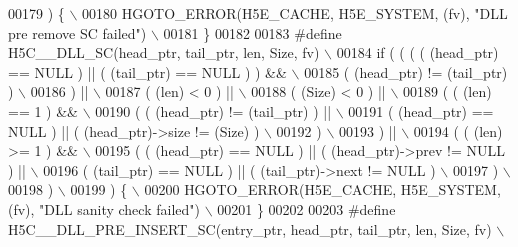 \begin{DoxyCode}
00179 \textcolor{preprocessor}{   ) \{                                                                       \(\backslash\)}
00180 \textcolor{preprocessor}{    HGOTO\_ERROR(H5E\_CACHE, H5E\_SYSTEM, (fv), "DLL pre remove SC failed")     \(\backslash\)}
00181 \textcolor{preprocessor}{\}}
00182 
00183 \textcolor{preprocessor}{#define H5C\_\_DLL\_SC(head\_ptr, tail\_ptr, len, Size, fv)                   \(\backslash\)}
00184 \textcolor{preprocessor}{if ( ( ( ( (head\_ptr) == NULL ) || ( (tail\_ptr) == NULL ) ) &&           \(\backslash\)}
00185 \textcolor{preprocessor}{       ( (head\_ptr) != (tail\_ptr) )                                      \(\backslash\)}
00186 \textcolor{preprocessor}{     ) ||                                                                \(\backslash\)}
00187 \textcolor{preprocessor}{     ( (len) < 0 ) ||                                                    \(\backslash\)}
00188 \textcolor{preprocessor}{     ( (Size) < 0 ) ||                                                   \(\backslash\)}
00189 \textcolor{preprocessor}{     ( ( (len) == 1 ) &&                                                 \(\backslash\)}
00190 \textcolor{preprocessor}{       ( ( (head\_ptr) != (tail\_ptr) ) ||                                 \(\backslash\)}
00191 \textcolor{preprocessor}{         ( (head\_ptr) == NULL ) || ( (head\_ptr)->size != (Size) )        \(\backslash\)}
00192 \textcolor{preprocessor}{       )                                                                 \(\backslash\)}
00193 \textcolor{preprocessor}{     ) ||                                                                \(\backslash\)}
00194 \textcolor{preprocessor}{     ( ( (len) >= 1 ) &&                                                 \(\backslash\)}
00195 \textcolor{preprocessor}{       ( ( (head\_ptr) == NULL ) || ( (head\_ptr)->prev != NULL ) ||       \(\backslash\)}
00196 \textcolor{preprocessor}{         ( (tail\_ptr) == NULL ) || ( (tail\_ptr)->next != NULL )          \(\backslash\)}
00197 \textcolor{preprocessor}{       )                                                                 \(\backslash\)}
00198 \textcolor{preprocessor}{     )                                                                   \(\backslash\)}
00199 \textcolor{preprocessor}{   ) \{                                                                   \(\backslash\)}
00200 \textcolor{preprocessor}{    HGOTO\_ERROR(H5E\_CACHE, H5E\_SYSTEM, (fv), "DLL sanity check failed")  \(\backslash\)}
00201 \textcolor{preprocessor}{\}}
00202 
00203 \textcolor{preprocessor}{#define H5C\_\_DLL\_PRE\_INSERT\_SC(entry\_ptr, head\_ptr, tail\_ptr, len, Size, fv) \(\backslash\)}

\end{DoxyCode}
